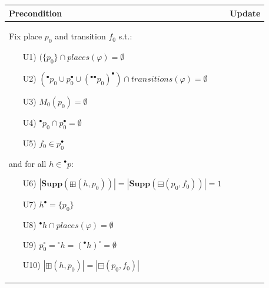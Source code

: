 \begin{figure}
    \vspace{5mm}
    \begin{adjustbox}{center}
        \begin{tabular}{|p{70mm}|p{70mm}|} \hline
        Precondition & Update \\ \hline
        Fix place $p_0$ and transition $f_0$ s.t.:
        \begin{itemize}[leftmargin=10mm]
            \item[U1)] $(\{p_0\} \cap places(\varphi) = \emptyset$
            \item[U2)] $({}^\bullet p_0 \cup p_0^\bullet \cup ({}^\bullet {}^\bullet p_0)^\bullet) \cap transitions(\varphi) = \emptyset$
            \item[U3)] $M_0(p_0)=\emptyset$
            \item[U4)] $^\bullet p_0 \cap p_0^\bullet = \emptyset$
            \item[U5)] $f_0 \in p_0^\bullet$
        \end{itemize}
        \hspace{2mm}
        and for all $h\in{}^\bullet p$:
        \begin{itemize}[leftmargin=10mm]
            \item[U6)] $|\textbf{Supp}(\boxplus(h, p_0))| = |\textbf{Supp}(\boxminus(p_0, f_0))| = 1$
            \item[U7)] $h^\bullet=\{p_0\}$
            \item[U8)] ${}^\bullet h \cap places(\varphi) = \emptyset$
            \item[U9)] $p_0^\circ = {}^\circ h = ({}^\bullet h)^\circ = \emptyset$
            \item[U10)] $|\boxplus(h, p_0)| = |\boxminus(p_0, f_0)|$

\end{itemize}
\end{tabular}
\end{adjustbox}
\end{figure}
